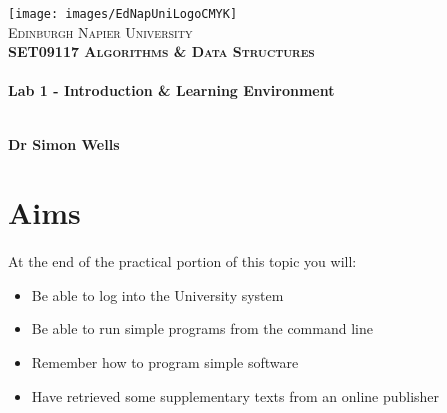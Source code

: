\documentclass[10pt, a4paper, twosize]{article}
\begin{document}

\begin{titlepage}
\vspace*{5cm}
\begin{center}
\texttt{[image: images/EdNapUniLogoCMYK]}~\\[1cm]

\textsc{\Large Edinburgh Napier University}\\[1.5cm]

\textsc{\LARGE \bfseries SET09117 Algorithms \& Data Structures}\\[0.5cm]

\hrulefill \\[0.4cm]
{\huge \bfseries Lab 1 - Introduction \& Learning Environment \\[0.4cm] }
\hrulefill \\[1.5cm]

\begin{minipage}{0.4\textwidth}
\begin{flushleft} \large
\textbf{Dr Simon Wells} \\
\end{flushleft}
\end{minipage}

\vfill

\end{center}
\end{titlepage}




%

\section{Aims}
\paragraph{} At the end of the practical portion of this topic you will:

\begin{itemize}
\item Be able to log into the University system
\item Be able to run simple programs from the command line
\item Remember how to program simple software
\item Have retrieved some supplementary texts from an online publisher
\end{itemize}
\end{document}

